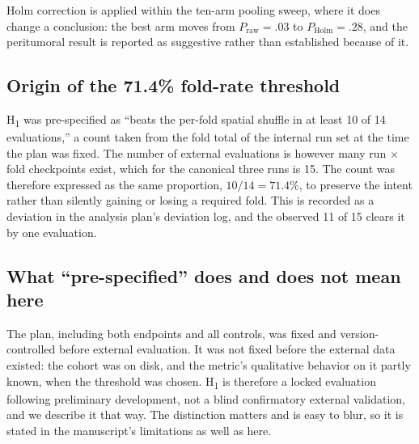 \documentclass[11pt]{article}
\begin{document}
Holm correction is applied within the ten-arm pooling sweep, where it does change
a conclusion: the best arm moves from $P_{\text{raw}} = .03$ to
$P_{\text{Holm}} = .28$, and the peritumoral result is reported as suggestive
rather than established because of it.

\subsection{Origin of the 71.4\% fold-rate threshold}

H\textsubscript{1} was pre-specified as ``beats the per-fold spatial shuffle in at
least 10 of 14 evaluations,'' a count taken from the fold total of the internal
run set at the time the plan was fixed. The number of external evaluations is
however many run $\times$ fold checkpoints exist, which for the canonical three
runs is 15. The count was therefore expressed as the same proportion,
$10/14 = 71.4\%$, to preserve the intent rather than silently gaining or losing a
required fold. This is recorded as a deviation in the analysis plan's deviation
log, and the observed 11 of 15 clears it by one evaluation.

\subsection{What ``pre-specified'' does and does not mean here}

The plan, including both endpoints and all controls, was fixed and
version-controlled before external evaluation. It was not fixed before the
external data existed: the cohort was on disk, and the metric's qualitative
behavior on it partly known, when the threshold was chosen. H\textsubscript{1} is
therefore a locked evaluation following preliminary development, not a blind
confirmatory external validation, and we describe it that way. The distinction
matters and is easy to blur, so it is stated in the manuscript's limitations as
well as here.
\end{document}
